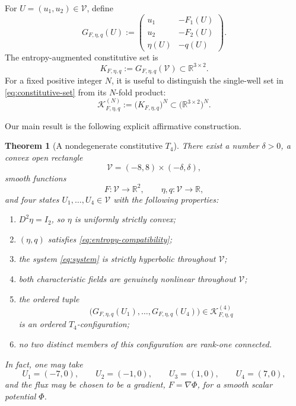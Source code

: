 \documentclass[11pt,reqno]{amsart}
\newtheorem{theorem}{Theorem}[section]
\theoremstyle{definition}
\newcommand{\R}{\mathbb{R}}
\newcommand{\V}{\mathcal{V}}
\newcommand{\Kprod}{\mathcal{K}}
\begin{document}
For $U=(u_1,u_2)\in\V$, define
\begin{equation}
  G_{F,\eta,q}(U)
  :=
  \begin{pmatrix}
    u_1 & -F_1(U)\\
    u_2 & -F_2(U)\\
    \eta(U) & -q(U)
  \end{pmatrix}.
  \label{eq:G-map}
\end{equation}
The entropy-augmented constitutive set is
\begin{equation}
  K_{F,\eta,q}
  :=G_{F,\eta,q}(\V)
  \subset\R^{3\times2}.
  \label{eq:constitutive-set}
\end{equation}
For a fixed positive integer $N$, it is useful to distinguish the single-well
set in \cref{eq:constitutive-set} from its $N$-fold product:
\begin{equation}
  \Kprod_{F,\eta,q}^{(N)}
  :=\bigl(K_{F,\eta,q}\bigr)^N
  \subset\bigl(\R^{3\times2}\bigr)^N.
  \label{eq:product-constitutive-set}
\end{equation}

Our main result is the following explicit affirmative construction.

\begin{theorem}[A nondegenerate constitutive $T_4$]
  \label{thm:main}
There exist a number $\delta>0$, a convex open rectangle
\begin{equation}
  \V=(-8,8)\times(-\delta,\delta),
  \label{eq:state-domain}
\end{equation}
smooth functions
\begin{equation}
  F\colon\V\to\R^2,
  \qquad
  \eta,q\colon\V\to\R,
\end{equation}
and four states $U_1,\ldots,U_4\in\V$ with the following properties:
\begin{enumerate}
  \item $D^2\eta=I_2$, so $\eta$ is uniformly strictly convex;
  \item $(\eta,q)$ satisfies \cref{eq:entropy-compatibility};
  \item the system \cref{eq:system} is strictly hyperbolic throughout $\V$;
  \item both characteristic fields are genuinely nonlinear throughout $\V$;
  \item the ordered tuple
  \begin{equation}
    \bigl(G_{F,\eta,q}(U_1),\ldots,G_{F,\eta,q}(U_4)\bigr)
    \in\Kprod_{F,\eta,q}^{(4)}
  \end{equation}
  is an ordered $T_4$-configuration;
  \item no two distinct members of this configuration are rank-one
  connected.
\end{enumerate}
In fact, one may take
\begin{equation}
  U_1=(-7,0),\qquad U_2=(-1,0),\qquad
  U_3=(1,0),\qquad U_4=(7,0),
  \label{eq:four-states}
\end{equation}
and the flux may be chosen to be a gradient, $F=\nabla\Phi$, for a smooth
scalar potential $\Phi$.
\end{theorem}
\end{document}
